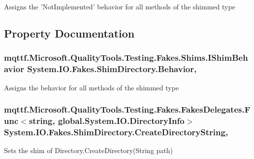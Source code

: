 Assigns the 'Not\-Implemented' behavior for all methods of the shimmed type



\subsection{Property Documentation}
\hypertarget{class_system_1_1_i_o_1_1_fakes_1_1_shim_directory_a23cf83f8dd6e2bb5d536effd6df21480}{
\subsubsection[{Behavior}]{\setlength{\rightskip}{0pt plus 5cm}mqttf.\-Microsoft.\-Quality\-Tools.\-Testing.\-Fakes.\-Shims.\-I\-Shim\-Behavior System.\-I\-O.\-Fakes.\-Shim\-Directory.\-Behavior\hspace{0.3cm}{\ttfamily [static]}, {\ttfamily [set]}}}\label{class_system_1_1_i_o_1_1_fakes_1_1_shim_directory_a23cf83f8dd6e2bb5d536effd6df21480}


Assigns the behavior for all methods of the shimmed type

\hypertarget{class_system_1_1_i_o_1_1_fakes_1_1_shim_directory_a897723efb5b5db0c15a1ec31423cb82b}{
\subsubsection[{Create\-Directory\-String}]{\setlength{\rightskip}{0pt plus 5cm}mqttf.\-Microsoft.\-Quality\-Tools.\-Testing.\-Fakes.\-Fakes\-Delegates.\-Func$<$string, global.\-System.\-I\-O.\-Directory\-Info$>$ System.\-I\-O.\-Fakes.\-Shim\-Directory.\-Create\-Directory\-String\hspace{0.3cm}{\ttfamily [static]}, {\ttfamily [set]}}}\label{class_system_1_1_i_o_1_1_fakes_1_1_shim_directory_a897723efb5b5db0c15a1ec31423cb82b}


Sets the shim of Directory.\-Create\-Directory(\-String path)

